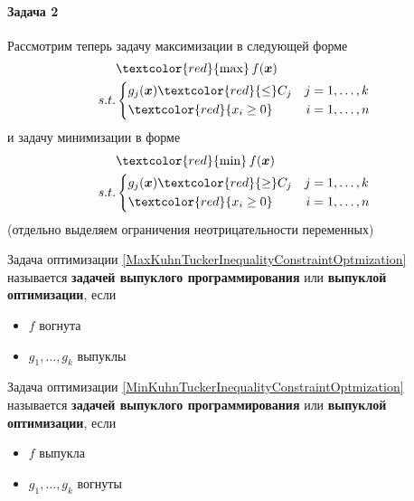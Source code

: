 \paragraph{Задача 2}

Рассмотрим теперь задачу максимизации в следующей форме
\begin{equation}\label{MaxKuhnTuckerInequalityConstraintOptmization}%
	\begin{aligned}
	&\textcolor{red}{\max}\, f(\vectx)  \\
	s.t. & \left\{ 
	\begin{aligned} 
	& g_j(\vectx)\textcolor{red}{\leq} C_j & j&=1,\ldots,k\\
	& \textcolor{red}{x_i\geq 0} &  i&=1,\ldots,n
	\end{aligned}\right.
	\end{aligned} 
\end{equation}
и задачу минимизации в форме
\begin{equation}\label{MinKuhnTuckerInequalityConstraintOptmization}%
	\begin{aligned}
		&\textcolor{red}{\min}\, f(\vectx)  \\
		s.t. & \left\{ 
		\begin{aligned} 
		& g_j(\vectx)\textcolor{red}{\geq} C_j & j&=1,\ldots,k\\
		& \textcolor{red}{x_i\geq 0} &  i&=1,\ldots,n
	\end{aligned}\right.
	\end{aligned} 
\end{equation}
(отдельно выделяем ограничения неотрицательности переменных)
\begin{definicion}
Задача оптимизации \eqref{MaxKuhnTuckerInequalityConstraintOptmization} называется 
\textbf{задачей выпуклого программирования} или \textbf{выпуклой оптимизации}, если
\begin{itemize}
	\item $f$ вогнута
	\item $g_1,\ldots,g_k$ выпуклы
\end{itemize}
Задача оптимизации \eqref{MinKuhnTuckerInequalityConstraintOptmization} называется 
\textbf{задачей выпуклого программирования} или \textbf{выпуклой оптимизации}, если
\begin{itemize}
	\item $f$ выпукла
	\item $g_1,\ldots,g_k$ вогнуты
\end{itemize}
\end{definicion}
